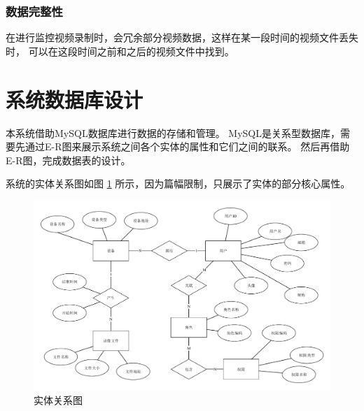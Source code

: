 \subsubsection{数据完整性}
在进行监控视频录制时，会冗余部分视频数据，这样在某一段时间的视频文件丢失时，
可以在这段时间之前和之后的视频文件中找到。

\section{系统数据库设计}
本系统借助MySQL数据库进行数据的存储和管理。
MySQL是关系型数据库，需要先通过E-R图来展示系统之间各个实体的属性和它们之间的联系\cite{李济同0}。
然后再借助 E-R图，完成数据表的设计。

系统的实体关系图如图 \ref{Fig:erd} 所示，因为篇幅限制，只展示了实体的部分核心属性。

\begin{figure}[ht]
    \centering
    \includegraphics[width=0.8\linewidth]{./Figure/IMG_er.pdf}
    \caption{实体关系图}\label{Fig:erd}
\end{figure}






